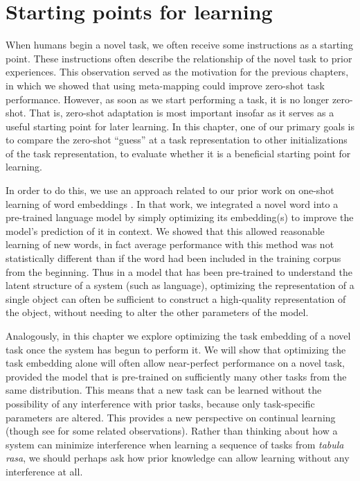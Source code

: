 \section{Starting points for learning}

When humans begin a novel task, we often receive some instructions as a starting point. These instructions often describe the relationship of the novel task to prior experiences. This observation served as the motivation for the previous chapters, in which we showed that using meta-mapping could improve zero-shot task performance. However, as soon as we start performing a task, it is no longer zero-shot. That is, zero-shot adaptation is most important insofar as it serves as a useful starting point for later learning. In this chapter, one of our primary goals is to compare the zero-shot ``guess'' at a task representation to other initializations of the task representation, to evaluate whether it is a beneficial starting point for learning. \par 
In order to do this, we use an approach related to our prior work on one-shot learning of word embeddings \citep{Lampinen2018a}. In that work, we integrated a novel word into a pre-trained language model by simply optimizing its embedding(s) to improve the model's prediction of it in context. We showed that this allowed reasonable learning of new words, in fact average performance with this method was not statistically different than if the word had been included in the training corpus from the beginning. Thus in a model that has been pre-trained to understand the latent structure of a system (such as language), optimizing the representation of a single object can often be sufficient to construct a high-quality representation of the object, without needing to alter the other parameters of the model. \par
Analogously, in this chapter we explore optimizing the task embedding of a novel task once the system has begun to perform it. We will show that optimizing the task embedding alone will often allow near-perfect performance on a novel task, provided the model that is pre-trained on sufficiently many other tasks from the same distribution. This means that a new task can be learned without the possibility of any interference with prior tasks, because only task-specific parameters are altered. This provides a new perspective on continual learning (though see \citep{Oswald2020} for some related observations). Rather than thinking about how a system can minimize interference when learning a sequence of tasks from \emph{tabula rasa}, we should perhaps ask how prior knowledge can allow learning without any interference at all. \par 
